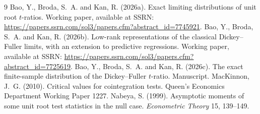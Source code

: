 \documentclass[11pt]{article}
\begin{document}
\begin{thebibliography}{9}
Bao, Y., Broda, S.~A. and Kan, R. (2026a).  Exact limiting distributions of unit root $t$-ratios.  Working paper, available at SSRN: \url{https://papers.ssrn.com/sol3/papers.cfm?abstract_id=7745921}.
Bao, Y., Broda, S.~A. and Kan, R. (2026b).  Low-rank representations of the classical Dickey--Fuller limits, with an extension to predictive regressions.  Working paper, available at SSRN: \url{https://papers.ssrn.com/sol3/papers.cfm?abstract_id=7725619}.
Bao, Y., Broda, S.~A. and Kan, R. (2026c).  The exact finite-sample distribution of the Dickey--Fuller $t$-ratio.  Manuscript.
MacKinnon, J.~G. (2010).  Critical values for cointegration tests.  Queen's Economics Department Working Paper 1227.
Nabeya, S. (1999).  Asymptotic moments of some unit root test statistics in the null case.  \emph{Econometric Theory} 15, 139--149.
\end{thebibliography}
\end{document}
